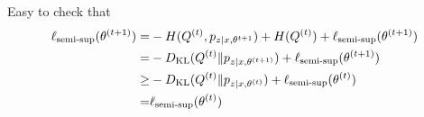 \begin{answer}
Easy to check that
\begin{align*}
 \ell_{\text{semi-sup}}(\theta^{(t+1)}) =& -H(Q^{(t)}, p_{z|x,\theta^{t+1}}) + H(Q^{(t)}) + \ell_{\text{semi-sup}}(\theta^{(t+1)}) \\
 = &-D_{\text{KL}}(Q^{(t)}\|p_{z|x,\theta^{(t+1)}}) + \ell_{\text{semi-sup}}(\theta^{(t+1)})\\
 \geq &-D_{\text{KL}}(Q^{(t)}\|p_{z|x,\theta^{(t)}}) + \ell_{\text{semi-sup}}(\theta^{(t)})\\
 = &\ell_{\text{semi-sup}}(\theta^{(t)})
\end{align*}
 \end{answer}

